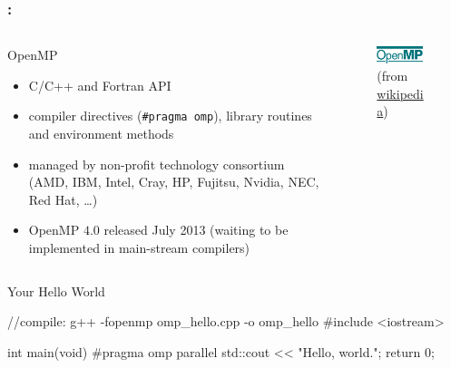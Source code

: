 \documentclass[9pt,xcolor=table]{beamer}
\begin{document}
\begin{frame}
\frametitle{\insertsectionhead{}: \insertsubsectionhead{}}
\begin{columns}[c]
  \begin{column}{.47\textwidth}
    \begin{block}{OpenMP}
      \begin{itemize}
      \item C/C++ and Fortran API
      \item compiler directives (\texttt{#pragma omp}), library routines and environment methods
      \item managed by non-profit technology consortium (AMD, IBM, Intel, Cray, HP, Fujitsu, Nvidia, NEC, Red Hat, \dots{})
      \item OpenMP $4.0$ released July 2013 (waiting to be implemented in main-stream compilers)
      \end{itemize}
    \end{block}
  \end{column}
    \begin{column}{.47\textwidth}
      \begin{figure}[htb]
        \includegraphics[width=0.9\textwidth]{img/Openmp}\\[2pt]\small
        (from \href{http://en.wikipedia.org/wiki/Openmp}{wikipedia})
      \end{figure}
    \end{column}
  \end{columns}
\pause
\begin{block}{Your Hello World}
  \begin{pyglist}[language=c++,numbers=left,style=emacs]
    //compile: g++ -fopenmp omp_hello.cpp -o omp_hello
    #include <iostream>
 
    int main(void)
    {
      #pragma omp parallel
      std::cout << "Hello, world.\n";
      return 0;
    }
  \end{pyglist}
\end{block}
\end{frame}
\end{document}
